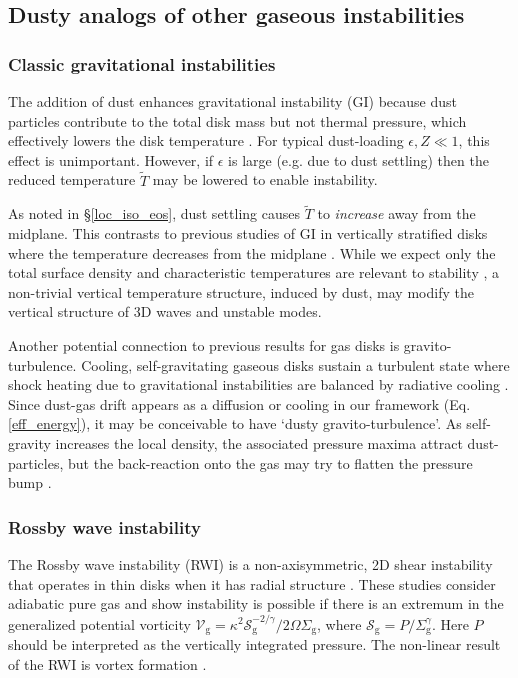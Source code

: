 \subsection{Dusty analogs of other gaseous instabilities}  


\subsubsection{Classic gravitational instabilities} %
The addition of dust enhances gravitational
instability (GI) because dust particles contribute to the
total disk mass but not thermal pressure, which effectively lowers the
disk temperature \citep[][]{thompson88,shi13}. For typical dust-loading 
$\epsilon, Z\ll1$, this effect is unimportant. However, if $\epsilon$ is
large (e.g. due to dust settling) then the reduced temperature
$\widetilde{T}$ may be lowered to enable instability.  

As noted in \S\ref{loc_iso_eos}, dust settling causes 
$\widetilde{T}$ to \emph{increase} away from the midplane. This contrasts
to previous studies of GI in vertically stratified disks
 where the temperature decreases
from the midplane \citep[e.g.][]{mamat10, kim12,lin14c}. 
While we expect only the total surface density and
characteristic temperatures are relevant to stability  
\citep{toomre64}, a non-trivial vertical temperature
structure, induced by dust, may modify the vertical structure of 3D
waves and unstable modes. 

Another potential connection to previous results for gas disks is  
gravito-turbulence. Cooling, self-gravitating gaseous disks 
sustain a turbulent state where shock heating due to gravitational 
instabilities are balanced by radiative cooling 
\citep{gammie01}. Since dust-gas drift appears as a diffusion or 
cooling in our framework (Eq. \ref{eff_energy}), it may be conceivable
to have `dusty gravito-turbulence'. As self-gravity increases the
local density, the associated pressure maxima attract dust-particles,
but the back-reaction onto the gas may try to flatten the pressure
bump \citep{taki16}. 


\subsubsection{Rossby wave instability}
The Rossby wave instability (RWI) is a non-axisymmetric, 2D shear
instability that operates in thin disks when it has radial structure
\citep{lovelace99,li00}. These studies consider adiabatic pure gas and 
show instability is possible if there is an extremum in the generalized
potential vorticity 
 $\mathcal{V}_\mathrm{g} =
 \kappa^2\mathcal{S}_\mathrm{g}^{-2/\gamma}/2\Omega\Sigma_\mathrm{g}$, 
where $\mathcal{S}_\mathrm{g} = P/\Sigma_\mathrm{g}^\gamma$. Here $P$
should be interpreted as the vertically integrated pressure. The
non-linear result of the RWI is vortex formation \citep{li01}. 

